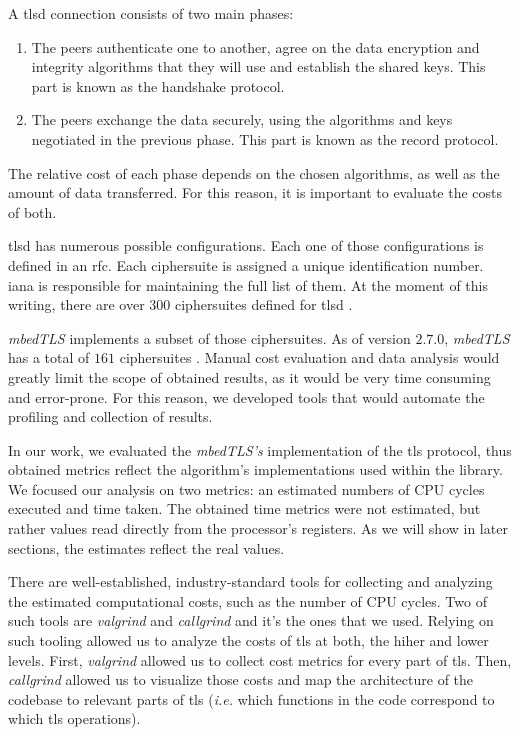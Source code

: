 \documentclass{llncs}
\begin{document}
A \gls{tlsd} connection consists of two main phases:
\begin{enumerate}
  \item The peers authenticate one to another, agree on the data encryption and integrity
  algorithms that they will use and establish the shared keys. This part is known as the handshake protocol.
 \item The peers exchange the data securely, using the algorithms and keys negotiated in
the previous phase. This part is known as the record protocol.
\end{enumerate}

The relative cost of each phase depends on the chosen algorithms, as well as the amount of data
transferred. For this reason, it is important to evaluate the costs of both.

\acrshort{tlsd} has numerous possible configurations. Each one of those configurations is defined
in an \gls{rfc}. Each ciphersuite is assigned a unique identification number. \gls{iana} is responsible for
maintaining the full list of them. At the moment of this writing, there are over $300$ ciphersuites
defined for \gls{tlsd} \cite{IANA_ciphers_list:online}.

\textit{mbedTLS} implements a subset of those ciphersuites. As of version $2.7.0$, \textit{mbedTLS}
has a total of $161$ ciphersuites \cite{mbedTLS_ciphers_list:online}. Manual cost evaluation and
data analysis would greatly limit the scope of obtained results, as it would be very time consuming
and error-prone. For this reason, we developed tools that would automate the profiling and collection
of results.

In our work, we evaluated the \textit{mbedTLS's} implementation of the \gls{tls} protocol, thus obtained
metrics reflect the algorithm's implementations used within the library. 
We focused our analysis on two metrics: an estimated numbers of CPU cycles executed and time taken.
The obtained time metrics were not estimated, but rather values read directly from the processor's registers.
As we will show in later sections, the estimates reflect the real values.

There are well-established, industry-standard tools for collecting and analyzing the estimated computational costs,
such as the number of CPU cycles. Two of such tools are \textit{valgrind} and \textit{callgrind} and it's the ones that we used. 
Relying on such tooling allowed us to analyze the costs of \gls{tls} at both, the hiher and lower levels.
First, \textit{valgrind} allowed us to collect cost metrics for every part of \gls{tls}. Then, \textit{callgrind}
allowed us to visualize those costs and map the architecture of the codebase to relevant parts of \gls{tls} (\textit{i.e.}
which functions in the code correspond to which \gls{tls} operations).
\end{document}
